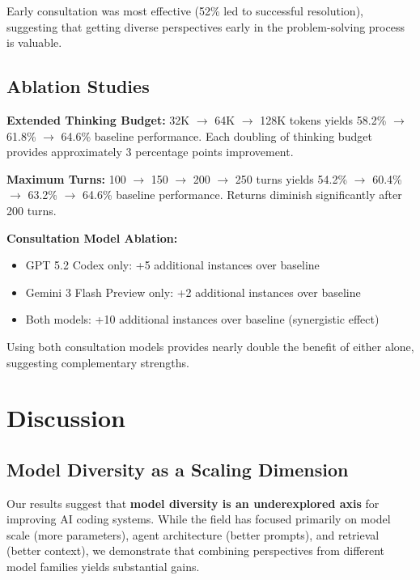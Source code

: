 \documentclass[11pt,a4paper]{article}
\begin{document}
Early consultation was most effective (52\% led to successful resolution), suggesting that getting diverse perspectives early in the problem-solving process is valuable.

\subsection{Ablation Studies}

\textbf{Extended Thinking Budget:} 32K $\rightarrow$ 64K $\rightarrow$ 128K tokens yields 58.2\% $\rightarrow$ 61.8\% $\rightarrow$ 64.6\% baseline performance. Each doubling of thinking budget provides approximately 3 percentage points improvement.

\textbf{Maximum Turns:} 100 $\rightarrow$ 150 $\rightarrow$ 200 $\rightarrow$ 250 turns yields 54.2\% $\rightarrow$ 60.4\% $\rightarrow$ 63.2\% $\rightarrow$ 64.6\% baseline performance. Returns diminish significantly after 200 turns.

\textbf{Consultation Model Ablation:} 
\begin{itemize}
    \item GPT 5.2 Codex only: +5 additional instances over baseline
    \item Gemini 3 Flash Preview only: +2 additional instances over baseline
    \item Both models: +10 additional instances over baseline (synergistic effect)
\end{itemize}

Using both consultation models provides nearly double the benefit of either alone, suggesting complementary strengths.

\section{Discussion}

\subsection{Model Diversity as a Scaling Dimension}

Our results suggest that \textbf{model diversity is an underexplored axis} for improving AI coding systems. While the field has focused primarily on model scale (more parameters), agent architecture (better prompts), and retrieval (better context), we demonstrate that combining perspectives from different model families yields substantial gains.
\end{document}

